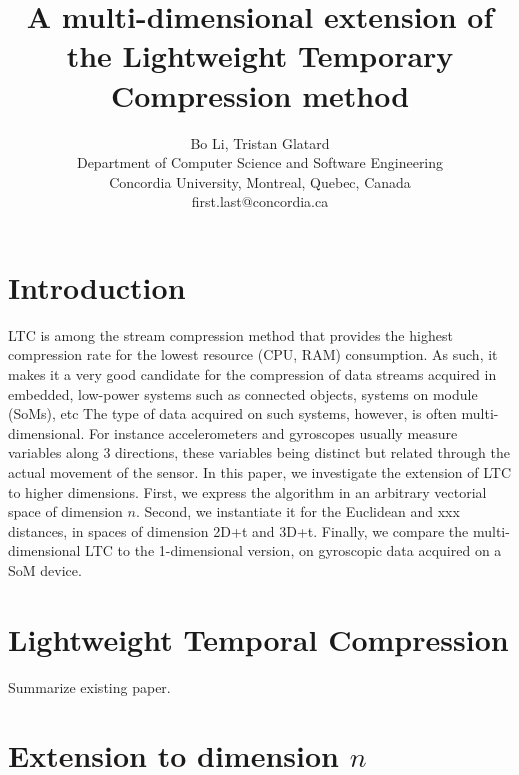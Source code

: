 \documentclass[10pt, conference, compsocconf]{IEEEtran}
\begin{document}
\title{A multi-dimensional extension of the Lightweight Temporary Compression method}

\author{Bo Li, Tristan Glatard\\
  Department of Computer Science and Software Engineering\\ Concordia University, Montreal, Quebec, Canada\\
  {first.last}@concordia.ca \vspace*{-0.5cm}}

\maketitle

\begin{abstract}
\end{abstract}

\section{Introduction}

LTC is among the stream compression method that provides the highest 
compression rate for the lowest resource (CPU, RAM) consumption. As 
such, it makes it a very good candidate for the compression of data 
streams acquired in embedded, low-power systems such as connected 
objects, systems on module (SoMs), etc The type of data acquired on 
such systems, however, is often multi-dimensional. For instance 
accelerometers and gyroscopes usually measure variables along 3 
directions, these variables being distinct but related through the 
actual movement of the sensor. In this paper, we investigate the 
extension of LTC to higher dimensions. First, we express the algorithm 
in an arbitrary vectorial space of dimension $n$. Second, we 
instantiate it for the Euclidean and xxx distances, in spaces of 
dimension 2D+t and 3D+t. Finally, we compare the multi-dimensional LTC 
to the 1-dimensional version, on gyroscopic data acquired on a SoM 
device.

\section{Lightweight Temporal Compression}

Summarize existing paper.

\section{Extension to dimension $n$}
\end{document}

